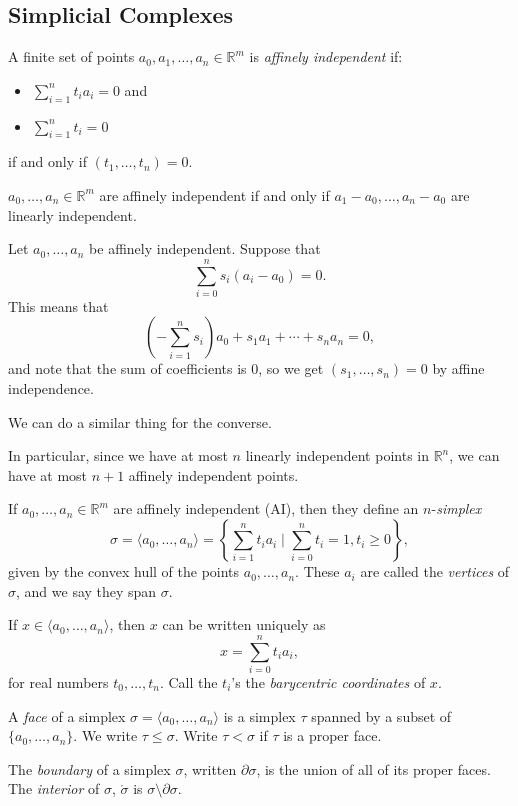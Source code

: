\documentclass[12pt]{article}
\begin{document}
\subsection{Simplicial Complexes}
\label{sub:simp_comp}

\begin{definition}
	A finite set of points $a_0, a_1, \ldots, a_n \in \mathbb{R}^m$ is \emph{affinely independent} if:
	\begin{itemize}
		\item $\sum_{i = 1}^n t_i a_i = 0$ and
		\item $\sum_{i = 1}^n t_i = 0$
	\end{itemize}
	if and only if $(t_1, \ldots, t_n) = 0$.
\end{definition}

\begin{lemma}
	$a_0, \ldots, a_n \in \mathbb{R}^m$ are affinely independent if and only if $a_1 - a_0, \ldots, a_n - a_0$ are linearly independent.
\end{lemma}

\begin{proofbox}
	Let $a_0, \ldots, a_n$ be affinely independent. Suppose that
	\[
	\sum_{i = 0 }^n s_i(a_i - a_0) = 0.
	\]
	This means that
	\[
		\left( - \sum_{i = 1}^n s_i \right)a_0 + s_1 a_1 + \cdots + s_n a_n = 0,
	\]
	and note that the sum of coefficients is $0$, so we get $(s_1, \ldots, s_n) = 0$ by affine independence.

	We can do a similar thing for the converse.
\end{proofbox}

In particular, since we have at most $n$ linearly independent points in $\mathbb{R}^n$, we can have at most $n + 1$ affinely independent points.

\begin{definition}
	If $a_0, \ldots, a_n \in \mathbb{R}^m$ are affinely independent (AI), then they define an $n$-\emph{simplex}
	\[
		\sigma = \langle a_0, \ldots, a_n \rangle = \left\{ \sum_{i = 1}^n t_i a_i \mid \sum_{i = 0}^n t_i = 1, t_i \geq 0 \right\},
	\]
	given by the convex hull of the points $a_0, \ldots, a_n$. These $a_i$ are called the \emph{vertices} of $\sigma$, and we say they span $\sigma$.

	If $x \in \langle a_0, \ldots, a_n \rangle$, then $x$ can be written uniquely as
	\[
	x = \sum_{i = 0}^n t_i a_i,
	\]
	for real numbers $t_0, \ldots, t_n$. Call the $t_i$'s the \emph{barycentric coordinates} of $x$.

	A \emph{face} of a simplex $\sigma = \langle a_0, \ldots, a_n \rangle$ is a simplex $\tau$ spanned by a subset of $\{a_0, \ldots, a_n\}$. We write $\tau \leq \sigma$. Write $\tau < \sigma$ if $\tau$ is a proper face.

	The \emph{boundary} of a simplex $\sigma$, written $\partial \sigma$, is the union of all of its proper faces. The \emph{interior} of $\sigma$, $\mathring \sigma$ is $\sigma \setminus \partial \sigma$.
\end{definition}
\end{document}
